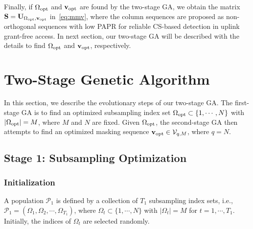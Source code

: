 \documentclass[journal]{IEEEtran}
\newcommand{\mP}{\mathcal{P}}
\newcommand{\mV}{\mathcal{V}}
\newcommand{\vbu}{{\bf v}}
\newcommand{\Sbu}{{\bf S}}
\newcommand{\Ubu}{{\bf U}}
\numberwithin{const2}{const}
\begin{document}
Finally, if $\Omega_{\rm opt}$ and $\vbu_{\rm opt}$ are found by the two-stage GA,
we obtain the matrix $\Sbu = \Ubu_{\Omega_{\rm opt}, \vbu_{\rm opt}}$ in~\eqref{eq:mmv}, 
where the column sequences are proposed as non-orthogonal sequences with low PAPR  
for reliable CS-based detection in uplink grant-free access.
In next section, our two-stage GA will be described 
with the details %
to find $\Omega_{\rm opt}$ and $\vbu_{\rm opt}$, respectively.




\section{Two-Stage Genetic Algorithm}
In this section, we describe the evolutionary steps of our two-stage GA. %
The first-stage GA is to find an optimized subsampling index set $\Omega_{\rm opt} \subset \{1, \cdots, N\}$ 
with $|\Omega_{\rm opt}| = M$, where $M$ and $N$ are fixed.
Given $\Omega_{\rm opt}$, 
the second-stage GA then attempts to find an optimized masking sequence $\vbu_{\rm opt} \in \mV_{q, M}$,
where $q = N$.



\subsection{Stage 1: Subsampling Optimization}

\subsubsection{Initialization}
A population $\mP_1$ is defined by a collection of $T_1$ subsampling index sets, i.e.,
$\mP_1 = (\Omega_1, \Omega_2, \cdots, \Omega_{T_1})$,
where $\Omega_t \subset \{1, \cdots, N\}$ with $|\Omega_t| = M$ for $t = 1, \cdots, T_1$.
Initially, the indices of $\Omega_t$ are selected randomly. %
\end{document}
